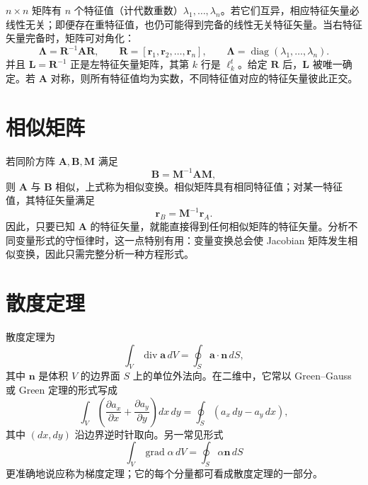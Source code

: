 \documentclass[11pt,a4paper,openany,fontset=none]{ctexbook}
\begin{document}
$n\times n$ 矩阵有 $n$ 个特征值（计代数重数）$\lambda_1,\ldots,\lambda_n$。若它们互异，相应特征矢量必线性无关；即便存在重特征值，也仍可能得到完备的线性无关特征矢量。当右特征矢量完备时，矩阵可对角化：
\begin{equation}
 \bm\Lambda=\bm R^{-1}\bm A\bm R,\qquad
 \bm R=[\bm r_1,\bm r_2,\ldots,\bm r_n],\qquad
 \bm\Lambda=\operatorname{diag}(\lambda_1,\ldots,\lambda_n). \tag{1.10.4--6}
\end{equation}
并且 $\bm L=\bm R^{-1}$ 正是左特征矢量矩阵，其第 $k$ 行是 $\bm\ell_k^t$。给定 $\bm R$ 后，$\bm L$ 被唯一确定。若 $\bm A$ 对称，则所有特征值均为实数，不同特征值对应的特征矢量彼此正交。

\section{相似矩阵}

若同阶方阵 $\bm A,\bm B,\bm M$ 满足
\begin{equation}
 \bm B=\bm M^{-1}\bm A\bm M, \tag{1.11.1}
\end{equation}
则 $\bm A$ 与 $\bm B$ 相似，上式称为相似变换。相似矩阵具有相同特征值；对某一特征值，其特征矢量满足
\begin{equation}
 \bm r_B=\bm M^{-1}\bm r_A. \tag{1.11.2}
\end{equation}
因此，只要已知 $\bm A$ 的特征矢量，就能直接得到任何相似矩阵的特征矢量。分析不同变量形式的守恒律时，这一点特别有用：变量变换总会使 Jacobian 矩阵发生相似变换，因此只需完整分析一种方程形式。

\section{散度定理}

散度定理为
\begin{equation}
 \int_V\operatorname{div}\bm a\,dV=\oint_S\bm a\cdot\bm n\,dS, \tag{1.12.1}
\end{equation}
其中 $\bm n$ 是体积 $V$ 的边界面 $S$ 上的单位外法向。在二维中，它常以 Green--Gauss 或 Green 定理的形式写成
\begin{equation}
 \int_V\left(\frac{\partial a_x}{\partial x}+\frac{\partial a_y}{\partial y}\right)dx\,dy
 =\oint_S(a_x\,dy-a_y\,dx), \tag{1.12.2}
\end{equation}
其中 $(dx,dy)$ 沿边界逆时针取向。另一常见形式
\begin{equation}
 \int_V\operatorname{grad}\alpha\,dV=\oint_S\alpha\bm n\,dS \tag{1.12.3}
\end{equation}
更准确地说应称为梯度定理；它的每个分量都可看成散度定理的一部分。
\end{document}
